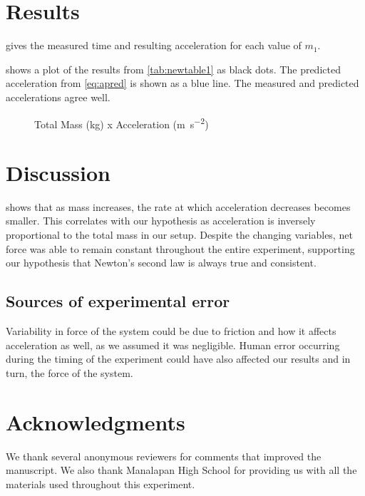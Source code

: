 ﻿\documentclass[reprint,amsmath,amssymb,aps,twoside]{revtex4-2}
\begin{document}
\section{Results}
 gives the measured time and resulting acceleration for each value of $m_1$. 

%	
%
 shows a plot of the results from \cref{tab:newtable1} as black dots. The predicted acceleration from \cref{eq:apred} is shown as a blue line. The measured and predicted accelerations agree well. 
\begin{figure}
\begin{center}

\end{center}
\caption{Total Mass (\unit{\kilo\gram}) x Acceleration (\unit{\meter\per\second\squared})}
\label{fig:2}
\end{figure}


\section{Discussion}
 shows that as mass increases, the rate at which acceleration decreases becomes smaller. This correlates with our hypothesis as acceleration is inversely proportional to the total mass in our setup. Despite the changing variables, net force was able to remain constant throughout the entire experiment, supporting our hypothesis that Newton’s second law is always true and consistent. 

\subsection{Sources of experimental error}
Variability in force of the system could be due to friction and how it affects acceleration as well, as we assumed it was negligible. Human error occurring during the timing of the experiment could have also affected our results and in turn, the force of the system. 

\section{Acknowledgments}
We thank several anonymous reviewers for comments that improved the manuscript. We also thank Manalapan High School for providing us with all the materials used throughout this experiment. 
\end{document}
